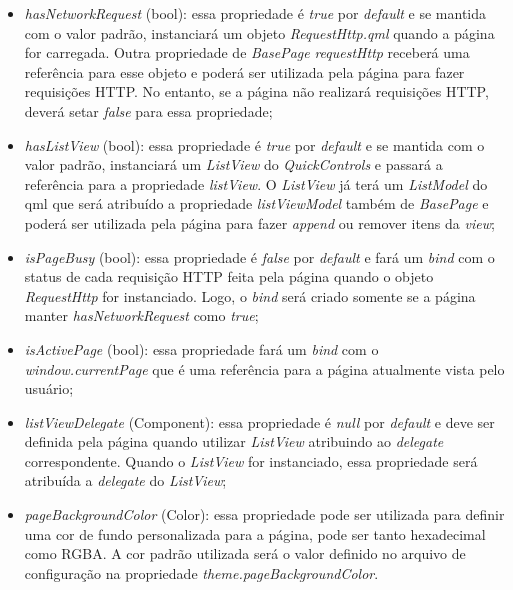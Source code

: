 \begin{itemize}
	\item \textit{hasNetworkRequest} (bool): essa propriedade é \textit{true} por \textit{default} e se mantida com o valor padrão, instanciará um objeto \textit{RequestHttp.qml} quando a página for carregada. Outra propriedade de \textit{BasePage} \textit{requestHttp} receberá uma referência para esse objeto e poderá ser utilizada pela página para fazer requisições HTTP. No entanto, se a página não realizará requisições HTTP, deverá setar \textit{false} para essa propriedade;

	\item \textit{hasListView} (bool): essa propriedade é \textit{true} por \textit{default} e se mantida com o valor padrão, instanciará um \textit{ListView} do \textit{QuickControls} e passará a referência para a propriedade \textit{listView}. O \textit{ListView} já terá um \textit{ListModel} do qml que será atribuído a propriedade \textit{listViewModel} também de \textit{BasePage} e poderá ser utilizada pela página para fazer \textit{append} ou remover itens da \textit{view};

	\item \textit{isPageBusy} (bool): essa propriedade é \textit{false} por \textit{default} e fará um \textit{bind} com o status de cada requisição HTTP feita pela página quando o objeto \textit{RequestHttp} for instanciado. Logo, o \textit{bind} será criado somente se a página manter \textit{hasNetworkRequest} como \textit{true};

	\item \textit{isActivePage} (bool): essa propriedade fará um \textit{bind} com o \textit{window.currentPage} que é uma referência para a página atualmente vista pelo usuário;

	\item \textit{listViewDelegate} (Component): essa propriedade é \textit{null} por \textit{default} e deve ser definida pela página quando utilizar \textit{ListView} atribuindo ao \textit{delegate} correspondente. Quando o \textit{ListView} for instanciado, essa propriedade será atribuída a \textit{delegate} do \textit{ListView};

	\item \textit{pageBackgroundColor} (Color): essa propriedade pode ser utilizada para definir uma cor de fundo personalizada para a página, pode ser tanto hexadecimal como RGBA. A cor padrão utilizada será o valor definido no arquivo de configuração na propriedade \textit{theme.pageBackgroundColor}.
\end{itemize}

